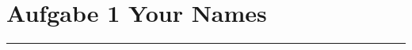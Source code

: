 \documentclass[a4paper, 11pt]{article}
\begin{document}
\section*{Aufgabe 1 \hspace{0.5em} \normalfont Your Names}





\vspace{3cm}
\hrule
\end{document}
